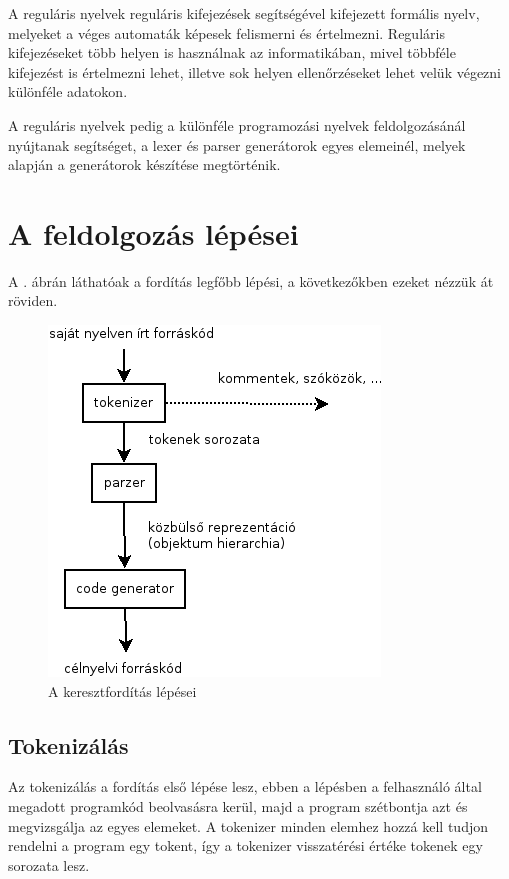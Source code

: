 A reguláris nyelvek reguláris kifejezések segítségével kifejezett formális nyelv, melyeket a véges automaták képesek felismerni és értelmezni. Reguláris kifejezéseket több helyen is használnak az informatikában, mivel többféle kifejezést is értelmezni lehet, illetve sok helyen ellenőrzéseket lehet velük végezni különféle adatokon.

A reguláris nyelvek pedig a különféle programozási nyelvek feldolgozásánál nyújtanak segítséget, a lexer és parser generátorok egyes elemeinél, melyek alapján a generátorok készítése megtörténik.



\section{A feldolgozás lépései}

A . ábrán láthatóak a fordítás legfőbb lépési, a következőkben ezeket nézzük át röviden.

\begin{figure}
\centering
\includegraphics[scale=1]{kepek/process.png}
\caption{A keresztfordítás lépései}
\label{fig:process}
\end{figure}

\subsection{Tokenizálás}

Az tokenizálás a fordítás első lépése lesz, ebben a lépésben a felhasználó által megadott programkód beolvasásra kerül, majd a program szétbontja azt és megvizsgálja az egyes elemeket. A tokenizer minden elemhez hozzá kell tudjon rendelni a program egy tokent, így a tokenizer visszatérési értéke tokenek egy sorozata lesz.

